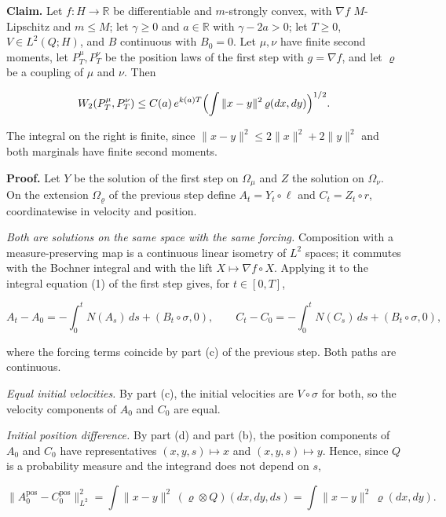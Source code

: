 \documentclass[11pt,a4paper]{article}
\begin{document}
\textbf{Claim.} Let \(f:H\to\mathbb R\) be differentiable and \(m\)-strongly convex, with \(\nabla f\) \(M\)-Lipschitz and \(m\le M\); let \(\gamma\ge0\) and \(a\in\mathbb R\) with \(\gamma-2a>0\); let \(T\ge0\), \(V\in L^2(Q;H)\), and \(B\) continuous with \(B_0=0\). Let \(\mu,\nu\) have finite second moments, let \(P^\mu_T,P^\nu_T\) be the position laws of the first step with \(g=\nabla f\), and let \(\varrho\) be a coupling of \(\mu\) and \(\nu\). Then


\[W_2(P^\mu_T,P^\nu_T)\le C(a)\,e^{k(a)T}\Bigl(\int\|x-y\|^2\,\varrho(dx,dy)\Bigr)^{1/2}.\]


The integral on the right is finite, since \(\|x-y\|^2\le2\|x\|^2+2\|y\|^2\) and both marginals have finite second moments.




\textbf{Proof.} Let \(Y\) be the solution of the first step on \(\Omega_\mu\) and \(Z\) the solution on \(\Omega_\nu\). On the extension \(\Omega_\varrho\) of the previous step define \(A_t=Y_t\circ\ell\) and \(C_t=Z_t\circ r\), coordinatewise in velocity and position.




\emph{Both are solutions on the same space with the same forcing.} Composition with a measure-preserving map is a continuous linear isometry of \(L^2\) spaces; it commutes with the Bochner integral and with the lift \(X\mapsto\nabla f\circ X\). Applying it to the integral equation (1) of the first step gives, for \(t\in[0,T]\),


\[A_t-A_0=-\int_0^tN(A_s)\,ds+(B_t\circ\sigma,0),\qquad C_t-C_0=-\int_0^tN(C_s)\,ds+(B_t\circ\sigma,0),\]


where the forcing terms coincide by part (c) of the previous step. Both paths are continuous.




\emph{Equal initial velocities.} By part (c), the initial velocities are \(V\circ\sigma\) for both, so the velocity components of \(A_0\) and \(C_0\) are equal.




\emph{Initial position difference.} By part (d) and part (b), the position components of \(A_0\) and \(C_0\) have representatives \((x,y,s)\mapsto x\) and \((x,y,s)\mapsto y\). Hence, since \(Q\) is a probability measure and the integrand does not depend on \(s\),


\[\|A_0^{\mathrm{pos}}-C_0^{\mathrm{pos}}\|_{L^2}^2=\int\|x-y\|^2\,(\varrho\otimes Q)(dx,dy,ds)=\int\|x-y\|^2\,\varrho(dx,dy).\]
\end{document}
